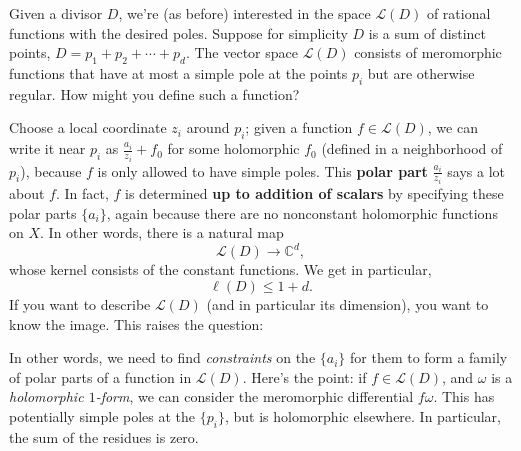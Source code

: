\documentclass[12pt]{article}
\begin{document}
    Given a divisor $D$, we're (as before) interested in the space $\mathcal{L}(D)$ of rational functions with the desired poles. Suppose for simplicity $D$ is a sum of distinct points, $D = p_1 + p_2 + \cdots + p_d$. The vector space $\mathcal{L}(D)$ consists of meromorphic functions that have at most a simple pole at the points $p_i$ but are otherwise regular. How might you define such a function?
    
    Choose a local coordinate $z_i$ around $p_i$; given a function $f \in \mathcal{L}(D)$, we can write it near $p_i$ as $\frac{a_i}{z_i} + f_0$ for some holomorphic $f_0$ (defined in a neighborhood of $p_i$), because $f$ is only allowed to have simple poles. This \textbf{polar part} $\frac{a_i}{z_i}$ says a lot about $f$. In fact, $f$ is determined \textbf{up to addition of scalars} by specifying these polar parts $\{a_i\}$, again because there are no nonconstant holomorphic functions on $X$. In other words, there is a natural map
    \[
    \mathcal{L}(D) \to \mathbb{C}^d,
    \]
    whose kernel consists of the constant functions. We get in particular,
    \[
    \ell(D) \leq 1 + d.
    \]    
    If you want to describe $\mathcal{L}(D)$ (and in particular its dimension), you want to know the image. This raises the question: 
    
    In other words, we need to find \emph{constraints} on the $\{a_i\}$ for them to form a family of polar parts of a function in $\mathcal{L}(D)$. Here's the point: if $f \in \mathcal{L}(D)$, and $\omega$ is a \emph{holomorphic $1$-form}, we can consider the meromorphic differential $f\omega$. This has potentially simple poles at the $\{p_i\}$, but is holomorphic elsewhere. In particular, the sum of the residues is zero.
    
\end{document}
